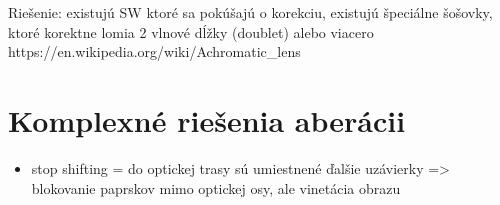 Riešenie: existujú SW \cite{automaticRemovalCA} ktoré sa pokúšajú o korekciu, 
existujú špeciálne šošovky, ktoré korektne lomia 2 vlnové dĺžky (doublet) alebo viacero
https://en.wikipedia.org/wiki/Achromatic\_lens

\section{Komplexné riešenia aberácii}
\begin{itemize}
    \item stop shifting = do optickej trasy sú umiestnené ďalšie uzávierky => blokovanie paprskov
        mimo optickej osy, ale vinetácia obrazu \cite{josesasian}
\end{itemize}
